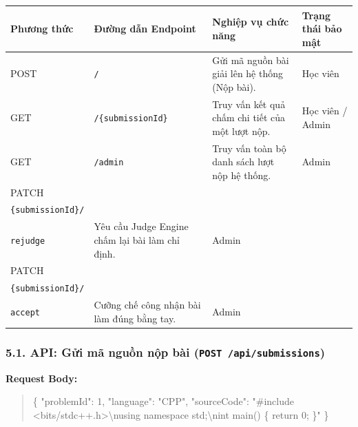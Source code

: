 \documentclass[12pt,a4paper]{article}
\makeatletter
\renewcommand{\_}{\BreakableUnderscore}
\newcommand{\tablecelllines}[1]{\begin{tabular}[t]{@{}l@{}}#1\end{tabular}}
\newenvironment{Shaded}{\vspace{3pt}\begin{quote}}{\end{quote}\vspace{3pt}}
\newcommand{\CharTok}[1]{\textcolor[rgb]{0.25,0.44,0.63}{#1}}
\newcommand{\DataTypeTok}[1]{\textcolor[rgb]{0.56,0.13,0.00}{#1}}
\newcommand{\DecValTok}[1]{\textcolor[rgb]{0.25,0.63,0.44}{#1}}
\newcommand{\FunctionTok}[1]{\textcolor[rgb]{0.02,0.16,0.49}{#1}}
\newcommand{\StringTok}[1]{\textcolor[rgb]{0.25,0.44,0.63}{#1}}
\makeatother
\begin{document}
\begin{longtable}[]{
  |>{\raggedright\arraybackslash}p{}
  |>{\raggedright\arraybackslash}p{}
  |>{\raggedright\arraybackslash}p{}
  |>{\raggedright\arraybackslash}p{}|}
\hline\rowcolor{tableHeader}
\begin{minipage}[b]{\linewidth}\raggedright
Phương thức
\end{minipage} & \begin{minipage}[b]{\linewidth}\raggedright
Đường dẫn Endpoint
\end{minipage} & \begin{minipage}[b]{\linewidth}\raggedright
Nghiệp vụ chức năng
\end{minipage} & \begin{minipage}[b]{\linewidth}\raggedright
Trạng thái bảo mật
\end{minipage} \\
\hline
\endhead
\hline
\endlastfoot
POST & \texttt{/} & Gửi mã nguồn bài giải lên hệ thống (Nộp bài). & Học viên \\
\hline
GET & \texttt{/\{submissionId\}} & Truy vấn kết quả chấm chi tiết của một lượt nộp. & Học viên / Admin \\
\hline
GET & \texttt{/admin} & Truy vấn toàn bộ danh sách lượt nộp hệ thống. & Admin \\
\hline
PATCH & \tablecelllines{\texttt{/admin/}\\\texttt{\{submissionId\}/}\\\texttt{rejudge}} & Yêu cầu Judge Engine chấm lại bài làm chỉ định. & Admin \\
\hline
PATCH & \tablecelllines{\texttt{/admin/}\\\texttt{\{submissionId\}/}\\\texttt{accept}} & Cưỡng chế công nhận bài làm đúng bằng tay. & Admin \\
\hline
\end{longtable}

\subsubsection{\texorpdfstring{5.1. API: Gửi mã nguồn nộp bài (\texttt{POST\ /api/submissions})}{5.1. API: Gửi mã nguồn nộp bài (POST /api/submissions)}}

\textbf{Request Body:}

\begin{Shaded}
\begin{Highlighting}[]
\FunctionTok{\{}
  \DataTypeTok{"problemId"}\FunctionTok{:} \DecValTok{1}\FunctionTok{,}
  \DataTypeTok{"language"}\FunctionTok{:} \StringTok{"CPP"}\FunctionTok{,}
  \DataTypeTok{"sourceCode"}\FunctionTok{:} \StringTok{"\#include \textless{}bits/stdc++.h\textgreater{}}\CharTok{\textbackslash{}n}\StringTok{using namespace std;}\CharTok{\textbackslash{}n}\StringTok{int main() \{ return 0; \}"}
\FunctionTok{\}}
\end{Highlighting}
\end{Shaded}
\end{document}
